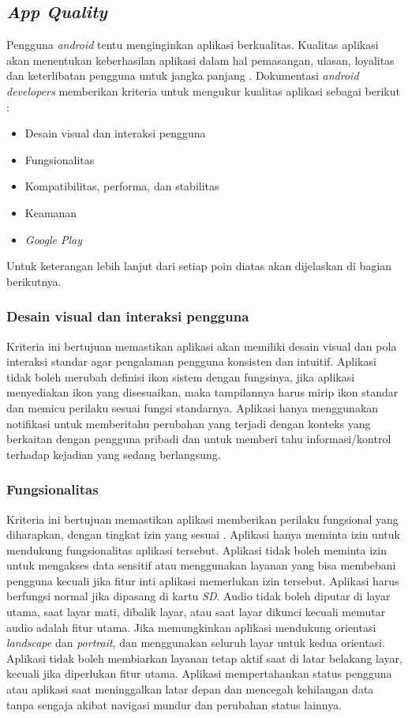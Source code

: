 \subsection{\textit{App Quality}}
Pengguna \textit{android} tentu menginginkan aplikasi berkualitas. Kualitas aplikasi akan menentukan keberhasilan aplikasi dalam hal pemasangan, ulasan, loyalitas dan keterlibatan pengguna untuk jangka panjang \cite{androiddesign}. Dokumentasi \textit{android developers} memberikan kriteria untuk mengukur kualitas aplikasi sebagai berikut :
\begin{itemize}
    \item Desain visual dan interaksi pengguna
    \item Fungsionalitas
    \item Kompatibilitas, performa, dan stabilitas
    \item Keamanan
    \item \textit{Google Play}
\end{itemize}
Untuk keterangan lebih lanjut dari setiap poin diatas akan dijelaskan di bagian berikutnya.

\subsubsection{Desain visual dan interaksi pengguna}
Kriteria ini bertujuan memastikan aplikasi akan memiliki desain visual dan pola interaksi standar agar pengalaman pengguna konsisten dan intuitif\cite{androiddev}. Aplikasi tidak boleh merubah definisi ikon sistem dengan fungsinya, jika aplikasi menyediakan ikon yang disesuaikan, maka tampilannya harus mirip ikon standar dan memicu perilaku sesuai fungsi standarnya. Aplikasi hanya menggunakan notifikasi untuk memberitahu perubahan yang terjadi dengan konteks yang berkaitan dengan pengguna pribadi dan untuk memberi tahu informasi/kontrol terhadap kejadian yang sedang berlangsung.

\subsubsection{Fungsionalitas}
Kriteria ini bertujuan memastikan aplikasi memberikan perilaku fungsional yang diharapkan, dengan tingkat izin yang sesuai \cite{androiddev}. Aplikasi hanya meminta izin untuk mendukung fungsionalitas aplikasi tersebut. Aplikasi tidak boleh meminta izin untuk mengakses data sensitif atau menggunakan layanan yang bisa membebani pengguna kecuali jika fitur inti aplikasi memerlukan izin tersebut.  Aplikasi harus berfungsi normal jika dipasang di kartu \textit{SD}. Audio tidak boleh diputar di layar utama, saat layar mati, dibalik layar, atau saat layar dikunci kecuali memutar audio adalah fitur utama. Jika memungkinkan aplikasi mendukung orientasi \textit{landscape} dan \textit{portrait}, dan menggunakan seluruh layar untuk kedua orientasi. Aplikasi tidak boleh membiarkan layanan tetap aktif saat di latar belakang layar, kecuali jika diperlukan fitur utama. Aplikasi mempertahankan status pengguna atau aplikasi saat meninggalkan latar depan dan mencegah kehilangan data tanpa sengaja akibat navigasi mundur dan perubahan status lainnya. 

